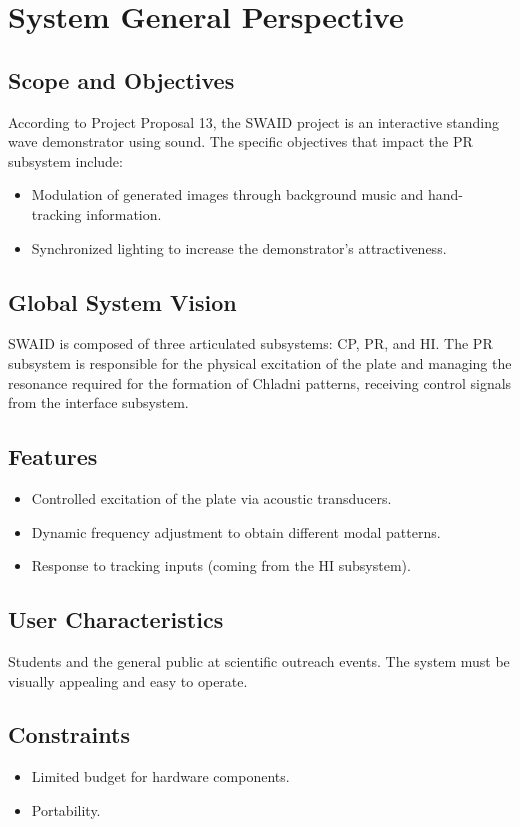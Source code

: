\section{System General Perspective}

\subsection{Scope and Objectives}
According to Project Proposal 13, the SWAID project is an interactive standing wave demonstrator using sound. The specific objectives that impact the PR subsystem include:
\begin{itemize}
    \item Modulation of generated images through background music and hand-tracking information.
    \item Synchronized lighting to increase the demonstrator's attractiveness.
\end{itemize}

\subsection{Global System Vision}
SWAID is composed of three articulated subsystems: CP, PR, and HI. The PR subsystem is responsible for the physical excitation of the plate and managing the resonance required for the formation of Chladni patterns, receiving control signals from the interface subsystem.

\subsection{Features}
\begin{itemize}
    \item Controlled excitation of the plate via acoustic transducers.
    \item Dynamic frequency adjustment to obtain different modal patterns.
    \item Response to tracking inputs (coming from the HI subsystem).
\end{itemize}

\subsection{User Characteristics}
Students and the general public at scientific outreach events. The system must be visually appealing and easy to operate.

\subsection{Constraints}
\begin{itemize}
    \item Limited budget for hardware components.
    \item Portability.
\end{itemize}